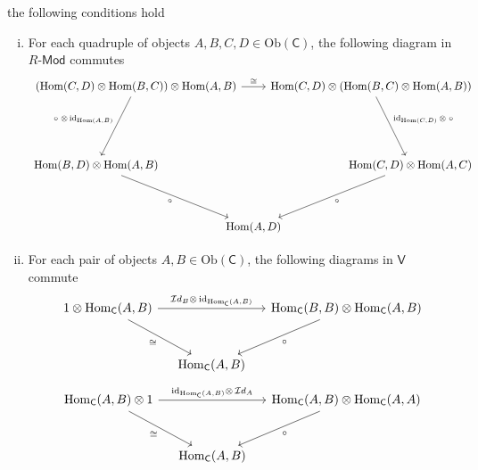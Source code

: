 \begin{prf}
    the following conditions hold
    \begin{enumerate}[(i)]
        \item For each quadruple of objects $A,B,C,D\in \mathrm{Ob}(\mathsf{C})$, the following diagram in $R\text{-}\mathsf{Mod}$ commutes
        \[
            \begin{tikzcd}[ampersand replacement=\&, column sep=small]
                    \&[-130pt] {\left(\mathrm{Hom}(C,D)\otimes \mathrm{Hom}(B,C)\right)\otimes \mathrm{Hom}(A,B) } \arrow[ld, "\circ\;\otimes \,\mathrm{id}_{\mathrm{Hom}(A,B)}"'] \arrow[rr, "\cong"] \&  [-30pt]   \&  [-30pt]{\mathrm{Hom}(C,D)\otimes \left(\mathrm{Hom}(B,C)\otimes \mathrm{Hom}(A,B)\right) } \arrow[rd, "\mathrm{id}_{\mathrm{Hom}(C,D)}\,\otimes\;\circ "] \&  [-130pt]  \\[+35pt]
{\mathrm{Hom}(B,D)\otimes \mathrm{Hom}(A,B) } \arrow[rrd, "\circ"'] \&                                                                                                                                    \&                                               \&                                                                                                               \& {\mathrm{Hom}(C,D)\otimes \mathrm{Hom}(A,C) } \arrow[lld, "\circ"] \\[+20pt]
                    \&                                                                                                                                    \& {\mathrm{Hom}(A,D)} \&                                                                                                               \&                                                                   
\end{tikzcd}
    \]
    \item For each pair of objects $A,B\in \mathrm{Ob}(\mathsf{C})$, the following diagrams in $\mathsf{V}$ commute
    \[
    \begin{tikzcd}[ampersand replacement=\&, column sep=small]
        {1\otimes \mathrm{Hom}_{\mathsf{C}}(A,B)} \arrow[rr, "{{\mathcal{I}d}_B\otimes\,\mathrm{id}_{\mathrm{Hom}_{\mathsf{C}}(A,B)}}"] \arrow[rd, "\cong"'] \&                     \& {\mathrm{Hom}_{\mathsf{C}}(B,B)\otimes \mathrm{Hom}_{\mathsf{C}}(A,B)} \arrow[ld, "\circ"] \\[+10pt]
        \& {\mathrm{Hom}_{\mathsf{C}}(A,B)} \&   
\end{tikzcd}
    \]
    \[
        \begin{tikzcd}[ampersand replacement=\&, column sep=small]
            {\mathrm{Hom}_{\mathsf{C}}(A,B)\otimes 1} \arrow[rr, "\mathrm{id}_{\mathrm{Hom}_{\mathsf{C}}(A,B)}\otimes\,{\mathcal{I}d}_A "] \arrow[rd, "\cong"'] \&                     \& {\mathrm{Hom}_{\mathsf{C}}(A,B)\otimes \mathrm{Hom}_{\mathsf{C}}(A,A)} \arrow[ld, "\circ"] \\[+10pt]
            \& {\mathrm{Hom}_{\mathsf{C}}(A,B)} \&
    \end{tikzcd}
        \]
    \end{enumerate}
\end{prf}

